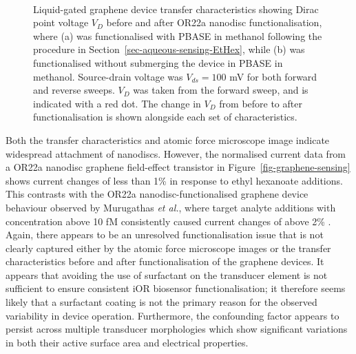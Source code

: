 \documentclass[
  a4paper,
]{scrbook}
\begin{document}
\begin{figure}
\begin{minipage}[t]{0.45\linewidth}
{{}

}

\end{minipage}%
%
\begin{minipage}[t]{0.01\linewidth}

{\centering 

~

}

\end{minipage}%

\caption[Liquid-gated graphene device transfer characteristics showing
Dirac point voltage before and after OR22a nanodisc functionalisation
with or without the use of PBASE and
methanol.]{\label{fig-graphene-sensing-TX}Liquid-gated graphene device
transfer characteristics showing Dirac point voltage \(V_{D}\) before
and after OR22a nanodisc functionalisation, where (a) was functionalised
with PBASE in methanol following the procedure in
Section~\ref{sec-aqueous-sensing-EtHex}, while (b) was functionalised
without submerging the device in PBASE in methanol. Source-drain voltage
was \(V_{ds} = 100\) mV for both forward and reverse sweeps. \(V_{D}\)
was taken from the forward sweep, and is indicated with a red dot. The
change in \(V_{D}\) from before to after functionalisation is shown
alongside each set of characteristics.}

\end{figure}

Both the transfer characteristics and atomic force microscope image
indicate widespread attachment of nanodiscs. However, the normalised
current data from a OR22a nanodisc graphene field-effect transistor in
Figure~\ref{fig-graphene-sensing} shows current changes of less than 1\%
in response to ethyl hexanoate additions. This contrasts with the OR22a
nanodisc-functionalised graphene device behaviour observed by Murugathas
\emph{et al.}, where target analyte additions with concentration above
10 fM consistently caused current changes of above 2\%
\autocite{Murugathas2020}. Again, there appears to be an unresolved
functionalisation issue that is not clearly captured either by the
atomic force microscope images or the transfer characteristics before
and after functionalisation of the graphene devices. It appears that
avoiding the use of surfactant on the transducer element is not
sufficient to ensure consistent iOR biosensor functionalisation; it
therefore seems likely that a surfactant coating is not the primary
reason for the observed variability in device operation. Furthermore,
the confounding factor appears to persist across multiple transducer
morphologies which show significant variations in both their active
surface area and electrical properties.
\end{document}
